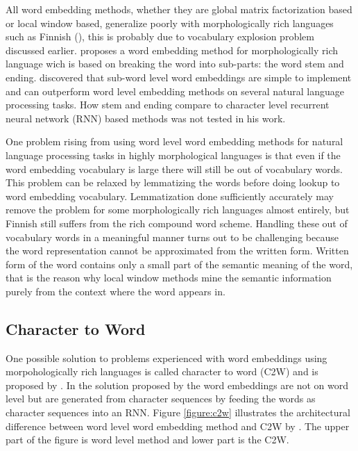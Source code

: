 \documentclass[12pt,a4paper,english
]{tutthesis}
\begin{document}
All word embedding methods, whether they are global matrix factorization based or local window based, generalize poorly with morphologically rich languages such as Finnish (\cite{Takala2016}), this is probably due to vocabulary explosion problem discussed earlier. \cite{Takala2016} proposes a word embedding method for morphologically rich language wich is based on breaking the word into sub-parts: the word stem and ending. \cite{Takala2016} discovered that sub-word level word embeddings are simple to implement and can outperform word level embedding methods on several natural language processing tasks. How stem and ending compare to character level recurrent neural network (RNN) based methods was not tested in his work.

One problem rising from using word level word embedding methods for natural language processing tasks in highly morphological languages is that even if the word embedding vocabulary is large there will still be out of vocabulary words. This problem can be relaxed by lemmatizing the words before doing lookup to word embedding vocabulary. Lemmatization done sufficiently accurately may remove the problem for some morphologically rich languages almost entirely, but Finnish still suffers from the rich compound word scheme. Handling these out of vocabulary words in a meaningful manner turns out to be challenging because the word representation cannot be approximated from the written form. Written form of the word contains only a small part of the semantic meaning of the word, that is the reason why local window methods mine the semantic information purely from the context where the word appears in.

\subsection{Character to Word}
One possible solution to problems experienced with word embeddings using morpohologically rich languages is called character to word (C2W) and is proposed by \cite{Ling2015}. In the solution proposed by \cite{Ling2015} the word embeddings are not on word level but are generated from character sequences by feeding the words as character sequences into an RNN. Figure \ref{figure:c2w} illustrates the architectural difference between word level word embedding method and C2W by \cite{Ling2015}. The upper part of the figure is word level method and lower part is the C2W.
\end{document}
